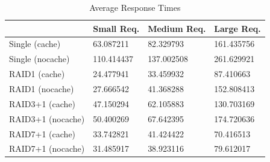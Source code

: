 \documentclass[paper=a4, fontsize=11pt]{scrartcl} %
\numberwithin{figure}{section} %
\numberwithin{table}{section} %
\begin{document}
\begin{table}[h]
\centering
\caption{Average Response Times}
\label{reptab2}
\begin{tabular}{|l|l|l|l|}
\hline
              & \textbf{Small Req.} & \textbf{Medium Req.} & \textbf{Large Req.} \\ \hline
Single (cache) & 63.087211                   & 82.329793                    & 161.435756                   \\ \hline
Single (nocache) & 110.414437                   & 137.002508                    & 261.629921                   \\ \hline
RAID1 (cache) & 24.477941                   & 33.459932                    & 87.410663                   \\ \hline
RAID1 (nocache) & 27.666542                   & 41.368288                    & 152.808413                   \\ \hline
RAID3+1 (cache) & 47.150294                   & 62.105883                    & 130.703169                   \\ \hline
RAID3+1 (nocache) & 50.400269                   & 67.642395                    & 174.720636                   \\ \hline
RAID7+1 (cache) & 33.742821                   & 41.424422                    & 70.416513                   \\ \hline
RAID7+1 (nocache) & 31.485917                   & 38.923116                    & 79.612017                   \\ \hline


\end{tabular}
\end{table}
\end{document}
